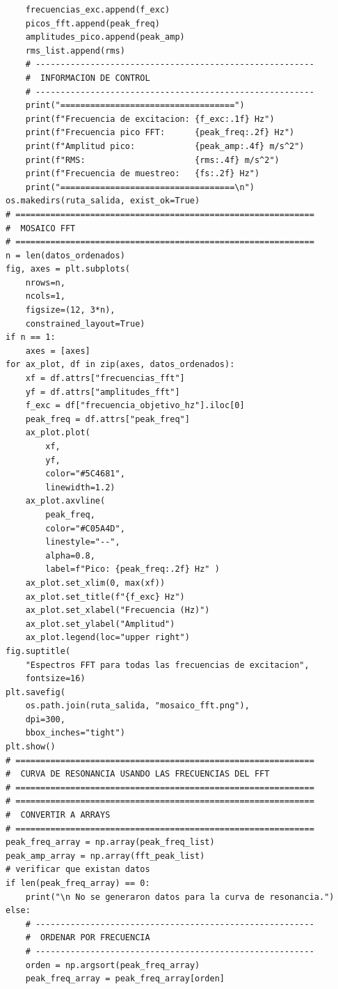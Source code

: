 \documentclass[10pt]{article}
\begin{document}
\begin{lstlisting}
    frecuencias_exc.append(f_exc)
    picos_fft.append(peak_freq)
    amplitudes_pico.append(peak_amp)
    rms_list.append(rms)
    # --------------------------------------------------------
    #  INFORMACION DE CONTROL
    # --------------------------------------------------------
    print("===================================")
    print(f"Frecuencia de excitacion: {f_exc:.1f} Hz")
    print(f"Frecuencia pico FFT:      {peak_freq:.2f} Hz")
    print(f"Amplitud pico:            {peak_amp:.4f} m/s^2")
    print(f"RMS:                      {rms:.4f} m/s^2")
    print(f"Frecuencia de muestreo:   {fs:.2f} Hz")
    print("===================================\n")
os.makedirs(ruta_salida, exist_ok=True)
# ============================================================
#  MOSAICO FFT
# ============================================================
n = len(datos_ordenados)
fig, axes = plt.subplots(
    nrows=n,
    ncols=1,
    figsize=(12, 3*n),
    constrained_layout=True)
if n == 1:
    axes = [axes]
for ax_plot, df in zip(axes, datos_ordenados):
    xf = df.attrs["frecuencias_fft"]
    yf = df.attrs["amplitudes_fft"]
    f_exc = df["frecuencia_objetivo_hz"].iloc[0]
    peak_freq = df.attrs["peak_freq"]
    ax_plot.plot(
        xf,
        yf,
        color="#5C4681",
        linewidth=1.2)
    ax_plot.axvline(
        peak_freq,
        color="#C05A4D",
        linestyle="--",
        alpha=0.8,
        label=f"Pico: {peak_freq:.2f} Hz" )
    ax_plot.set_xlim(0, max(xf))
    ax_plot.set_title(f"{f_exc} Hz")
    ax_plot.set_xlabel("Frecuencia (Hz)")
    ax_plot.set_ylabel("Amplitud")
    ax_plot.legend(loc="upper right")
fig.suptitle(
    "Espectros FFT para todas las frecuencias de excitacion",
    fontsize=16)
plt.savefig(
    os.path.join(ruta_salida, "mosaico_fft.png"),
    dpi=300,
    bbox_inches="tight")
plt.show()
# ============================================================
#  CURVA DE RESONANCIA USANDO LAS FRECUENCIAS DEL FFT
# ============================================================
# ============================================================
#  CONVERTIR A ARRAYS
# ============================================================
peak_freq_array = np.array(peak_freq_list)
peak_amp_array = np.array(fft_peak_list)
# verificar que existan datos
if len(peak_freq_array) == 0:
    print("\n No se generaron datos para la curva de resonancia.")
else:
    # --------------------------------------------------------
    #  ORDENAR POR FRECUENCIA
    # --------------------------------------------------------
    orden = np.argsort(peak_freq_array)
    peak_freq_array = peak_freq_array[orden]

\end{lstlisting}
\end{document}
